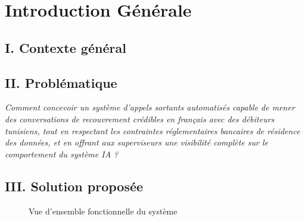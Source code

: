 \chapter*{Introduction G\'en\'erale}

\section*{I. Contexte g\'en\'eral}


\section*{II. Probl\'ematique}

\begin{definition}
\textit{Comment concevoir un syst\`eme d'appels sortants automatis\'es capable
de mener des conversations de recouvrement cr\'edibles en fran\c{c}ais avec des
d\'ebiteurs tunisiens, tout en respectant les contraintes r\'eglementaires
bancaires de r\'esidence des donn\'ees, et en offrant aux superviseurs une
visibilit\'e compl\`ete sur le comportement du syst\`eme IA ?}
\end{definition}

\section*{III. Solution propos\'ee}


\begin{figure}[H]
  \centering
  
  \caption{Vue d'ensemble fonctionnelle du syst\`eme}
  \label{fig:intro_overview}
\end{figure}

